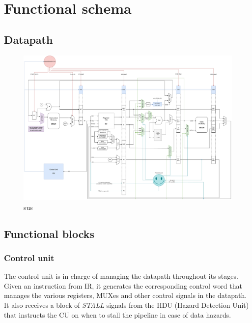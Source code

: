 \chapter{Functional schema}

\section{Datapath}

\begin{figure}[ht]
	\centering
	\includegraphics[width=\textwidth]{chapters/figures/datapath.pdf} 
	\caption{sus}
	\label{fig:datapath}
\end{figure}


\section{Functional blocks}
\subsection{Control unit}
The control unit is in charge of managing the datapath throughout its stages. Given an instruction from IR, it generates the corresponding control word that manages the various registers, MUXes and other control signals in the datapath. It also receives a block of \emph{STALL} signals from the HDU (Hazard Detection Unit) that instructs the CU on when to stall the pipeline in case of data hazards. %



